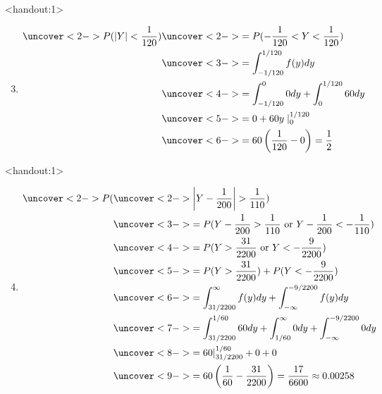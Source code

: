 \documentclass[handout]{beamer}\usepackage[]{graphicx}\usepackage[]{color}
\newcommand{\answers}{1}
\numberwithin{equation}{section}
\begin{document}
\begin{frame}<handout:\answers>
\begin{enumerate}[1. ]
\setcounter{enumi}{2}
\item 
\begin{align*}
\uncover<2->{ P(|Y| < \frac{1}{120})} & \uncover<2->{ = P(-\frac{1}{120} < Y < \frac{1}{120})} \\
&\uncover<3->{ = \int_{-1/120}^{1/120} f(y) dy} \\
& \uncover<4->{ = \int_{-1/120}^0 0 dy + \int_{0}^{1/120} 60 dy} \\
& \uncover<5->{ = 0 + 60y \mid_{0}^{1/120}} \\
& \uncover<6->{ = 60 \left (\frac{1}{120} - 0 \right ) = \frac{1}{2}}
\end{align*}
\end{enumerate}
\end{frame}

\begin{frame}<handout:\answers>
\begin{enumerate}[1. ]
\setcounter{enumi}{3}
\item 
\begin{align*}
\uncover<2->{ P(} &\uncover<2->{  \left |Y - \frac{1}{200} \right | > \frac{1}{110})} \\
&\uncover<3->{ = P(Y - \frac{1}{200} > \frac{1}{110} \text{ or } Y - \frac{1}{200} < -\frac{1}{110})} \\
&\uncover<4->{ = P(Y > \frac{31}{2200} \text{ or } Y < -\frac{9}{2200}) }\\
&\uncover<5->{ = P(Y > \frac{31}{2200}) + P(Y < -\frac{9}{2200})} \\
&\uncover<6->{ = \int_{31/2200}^\infty f(y) dy + \int_{-\infty}^{-9/2200} f(y)dy} \\
&\uncover<7->{ = \int_{31/2200}^{1/60} 60 dy + \int_{1/60}^\infty 0 dy + \int_{-\infty}^{-9/2200} 0 dy} \\
&\uncover<8->{ = 60 |_{31/2200}^{1/60} + 0 + 0} \\
&\uncover<9->{  = 60 \left (\frac{1}{60} - \frac{31}{2200} \right  ) = \frac{17}{6600} \approx 0.00258}
\end{align*}
\end{enumerate}
\end{frame}
\end{document}
